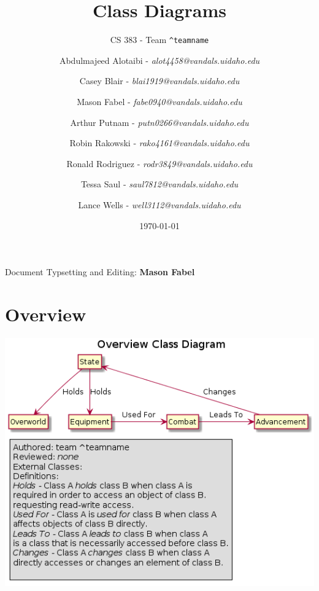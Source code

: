 \documentclass[12pt]{article}
\title{Class Diagrams}
\subtitle{CS 383 - Team \texttt{\textasciicircum teamname}}
\date{\today}
\author{
Abdulmajeed Alotaibi - \textit{alot4458@vandals.uidaho.edu} \\
\and Casey Blair - \textit{blai1919@vandals.uidaho.edu} \\
\and Mason Fabel - \textit{fabe0940@vandals.uidaho.edu} \\
\and Arthur Putnam - \textit{putn0266@vandals.uidaho.edu} \\
\and Robin Rakowski - \textit{rako4161@vandals.uidaho.edu} \\
\and Ronald Rodriguez - \textit{rodr3849@vandals.uidaho.edu} \\
\and Tessa Saul - \textit{saul7812@vandals.uidaho.edu} \\
\and Lance Wells - \textit{well3112@vandals.uidaho.edu} \\
}
\begin{document}
\maketitle

\tableofcontents
Document Typsetting and Editing: \textbf{Mason Fabel}
\clearpage

\section{Overview}
\includegraphics[width=\textwidth]{overview.png}
\end{document}
